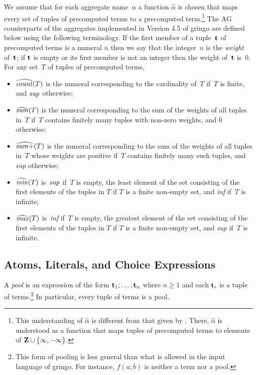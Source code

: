 \documentclass{tlp}
\begin{document}
We assume that for each aggregate name~$\alpha$ a function $\widehat \alpha$
is chosen that maps every set of tuples of precomputed terms to a precomputed
term.\footnote{\label{ft3}This understanding of $\widehat \alpha$ is different from that
given by  \citeyear[Section~3.3]{har14a}. There, $\widehat \alpha$ is understood as
a function that maps tuples of precomputed terms to elements of $\bf Z \cup
\{\infty, - \infty\}$. }
The AG counterparts of the aggregates implemented in Version 4.5 of
{\sc gringo} are defined below using the following terminology.
If the first member of a tuple~$\bf t$
of precomputed terms is a numeral $\overline n$ then we say that the integer~$n$ is
the {\sl weight} of~$\bf t$; if $\bf t$ is empty or its first member is not
an integer then the weight of~$\bf t$ is~0.
For any set~$T$ of tuples of precomputed terms,
\begin{itemize}
\item $\widehat{{\it count}}(T)$ is the numeral corresponding to the cardinality of~$T$ if~$T$ is finite, and
${\it sup}$ otherwise;
\item $\widehat{{\it sum}}(T)$ is the numeral corresponding to the sum of the
weights of all tuples in~$T$
if~$T$ contains finitely many tuples with non-zero weights, and $0$ otherwise;
\item $\widehat{{\it sum+}}(T)$ is the numeral corresponding to the sum of the
weights of all tuples in~$T$
whose weights are positive if~$T$ contains finitely many such tuples,
and {\it sup} otherwise;
\item $\widehat{{\it min}}(T)$ is~${\it sup}$ if~$T$ is empty, the
least element of the set consisting of the first elements of the tuples in $T$
if $T$ is a finite non-empty set, and {\it inf} if~$T$ is infinite;
\item
$\widehat{{\it max}}(T)$ is~{\it inf} if~$T$ is empty, the greatest element
of the set consisting of the first elements of the tuples in $T$
if $T$ is a finite non-empty set, and {\it sup} if~$T$ is infinite.
\end{itemize}

\subsection{Atoms, Literals, and Choice Expressions}

A {\sl pool} is an expression of the form
${\bf t}_1 ; \dots ; {\bf t}_n$  where $n \geq 1$ and each ${\bf t}_i$
is a tuple of terms.\footnote{This form of pooling is less general than what
is allowed in the input language of {\sc gringo}.  For instance, $f(a;b)$ is
neither a term nor a pool.}
In particular, every tuple of terms is a pool.
\end{document}
